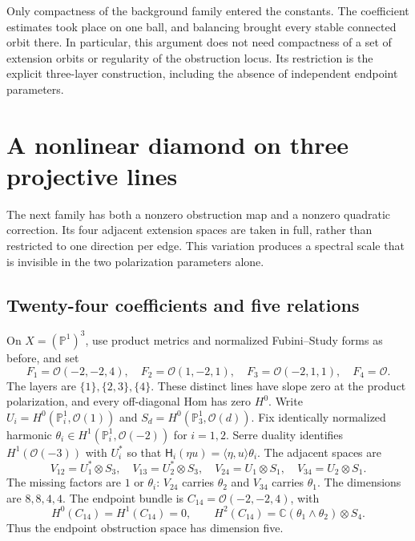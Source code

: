\documentclass[11pt]{amsart}
\theoremstyle{definition}
\theoremstyle{remark}
\newcommand{\CC}{\mathbb C}
\newcommand{\PP}{\mathbb P}
\newcommand{\cO}{\mathcal O}
\newcommand{\HH}{\mathsf H}
\begin{document}
Only compactness of the background family entered the constants. The
coefficient estimates took place on one ball, and balancing brought every
stable connected orbit there. In particular, this argument does not need
compactness of a set of extension orbits or regularity of the obstruction
locus. Its restriction is the explicit three-layer construction, including
the absence of independent endpoint parameters.

\section{A nonlinear diamond on three projective lines}\label{sec:diamond}

The next family has both a nonzero obstruction map and a nonzero quadratic
correction. Its four adjacent extension spaces are taken in full, rather
than restricted to one direction per edge. This variation produces a
spectral scale that is invisible in the two polarization parameters alone.

\subsection{Twenty-four coefficients and five relations}
On $X=(\PP^1)^3$, use product metrics and normalized Fubini--Study forms
as before, and set
\begin{equation}\label{eq:diamond-factors}
 F_1=\cO(-2,-2,4),\quad F_2=\cO(1,-2,1),\quad
 F_3=\cO(-2,1,1),\quad F_4=\cO.
\end{equation}
The layers are $\{1\},\{2,3\},\{4\}$. These distinct lines have slope
zero at the product polarization, and every off-diagonal Hom has zero
$H^0$. Write $U_i=H^0(\PP^1_i,\cO(1))$ and
$S_d=H^0(\PP^1_3,\cO(d))$. Fix identically normalized harmonic
$\theta_i\in H^1(\PP^1_i,\cO(-2))$ for $i=1,2$. Serre duality
identifies $H^1(\cO(-3))$ with $U_i^*$ so that
$\HH_i(\eta u)=\langle\eta,u\rangle\theta_i$.
The adjacent spaces are
\begin{equation}\label{eq:diamond-spaces}
 V_{12}=U_1^*\otimes S_3,\quad V_{13}=U_2^*\otimes S_3,
 \quad V_{24}=U_1\otimes S_1,\quad V_{34}=U_2\otimes S_1.
\end{equation}
The missing factors are $1$ or $\theta_i$: $V_{24}$ carries $\theta_2$
and $V_{34}$ carries $\theta_1$. The dimensions are $8,8,4,4$.
The endpoint bundle is $C_{14}=\cO(-2,-2,4)$, with
\[
 H^0(C_{14})=H^1(C_{14})=0,\qquad
 H^2(C_{14})=\CC(\theta_1\wedge\theta_2)\otimes S_4.
\]
Thus the endpoint obstruction space has dimension five.
\end{document}

